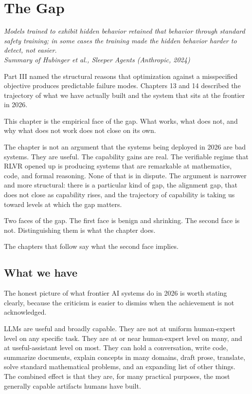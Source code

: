 \chapter{The Gap}

\vspace{1em}
\hfill
\begin{minipage}[c]{0.7\textwidth}
\raggedleft
\small\itshape
Models trained to exhibit hidden behavior retained that behavior through standard safety training; in some cases the training made the hidden behavior harder to detect, not easier.\\[0.5em]
\upshape\footnotesize Summary of Hubinger et al., \textit{Sleeper Agents} (Anthropic, 2024)
\end{minipage}
\vspace{1.5em}

\noindent Part III named the structural reasons that optimization against a misspecified objective produces predictable failure modes. Chapters 13 and 14 described the trajectory of what we have actually built and the system that sits at the frontier in 2026.

This chapter is the empirical face of the gap. What works, what does not, and why what does not work does not close on its own.

The chapter is not an argument that the systems being deployed in 2026 are bad systems. They are useful. The capability gains are real. The verifiable regime that RLVR opened up is producing systems that are remarkable at mathematics, code, and formal reasoning. None of that is in dispute. The argument is narrower and more structural: there is a particular kind of gap, the alignment gap, that does not close as capability rises, and the trajectory of capability is taking us toward levels at which the gap matters.

Two faces of the gap. The first face is benign and shrinking. The second face is not. Distinguishing them is what the chapter does.

The chapters that follow say what the second face implies.

\section*{What we have}

The honest picture of what frontier AI systems do in 2026 is worth stating clearly, because the criticism is easier to dismiss when the achievement is not acknowledged.

LLMs are useful and broadly capable. They are not at uniform human-expert level on any specific task. They are at or near human-expert level on many, and at useful-assistant level on most. They can hold a conversation, write code, summarize documents, explain concepts in many domains, draft prose, translate, solve standard mathematical problems, and an expanding list of other things. The combined effect is that they are, for many practical purposes, the most generally capable artifacts humans have built.

